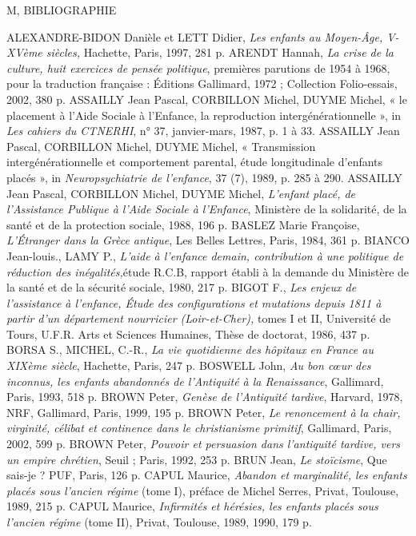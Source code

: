M, BIBLIOGRAPHIE
 
ALEXANDRE-BIDON Danièle et LETT Didier, \emph{Les enfants au Moyen-Âge, V-XVème siècles,} Hachette, Paris, 1997, 281 p.
ARENDT Hannah, \emph{La crise de la culture, huit exercices de pensée politique}, premières parutions de 1954 à 1968, pour la traduction française : Éditions Gallimard, 1972 ; Collection Folio-essais, 2002, 380 p.
ASSAILLY Jean Pascal, CORBILLON Michel, DUYME Michel, « le placement à l'Aide Sociale à l'Enfance, la reproduction intergénérationnelle », in \emph{Les cahiers du CTNERHI}, n° 37, janvier-mars, 1987, p. 1 à 33.
ASSAILLY Jean Pascal, CORBILLON Michel, DUYME Michel, « Transmission intergénérationnelle et comportement parental, étude longitudinale d'enfants placés », in \emph{Neuropsychiatrie de l'enfance}, 37 (7), 1989, p. 285 à 290.
ASSAILLY Jean Pascal, CORBILLON Michel, DUYME Michel, \emph{L'enfant placé, de l'Assistance Publique à l'Aide Sociale à l'Enfance}, Ministère de la solidarité, de la santé et de la protection sociale, 1988, 196 p.
BASLEZ Marie Françoise, \emph{L'Étranger dans la Grèce antique}, Les Belles Lettres, Paris, 1984, 361 p.
BIANCO Jean-louis., LAMY P., \emph{L'aide à l'enfance demain, contribution à une politique de réduction des inégalités,}étude R.C.B, rapport établi à la demande du Ministère de la santé et de la sécurité sociale, 1980, 217 p.
BIGOT F., \emph{Les enjeux de l'assistance à l'enfance, Étude des configurations et mutations depuis 1811 à partir d'un département nourricier (Loir-et-Cher),} tomes I et II, Université de Tours, U.F.R. Arts et Sciences Humaines, Thèse de doctorat, 1986, 437 p.
BORSA S., MICHEL, C.-R., \emph{La vie quotidienne des hôpitaux en France au XIXème siècle}, Hachette, Paris, 247 p.
BOSWELL John, \emph{Au bon cœur des inconnus, les enfants abandonnés de l'Antiquité à la Renaissance}, Gallimard, Paris, 1993, 518 p.
BROWN Peter, \emph{Genèse de l'Antiquité tardive}, Harvard, 1978, NRF, Gallimard, Paris, 1999, 195 p.
BROWN Peter, \emph{Le renoncement à la chair, virginité, célibat et continence dans le christianisme primitif}, Gallimard, Paris, 2002, 599 p.
BROWN Peter, \emph{Pouvoir et persuasion dans l'antiquité tardive, vers un empire chrétien}, Seuil ; Paris, 1992, 253 p.
BRUN Jean, \emph{Le stoïcisme}, Que sais-je ? PUF, Paris, 126 p.
CAPUL Maurice, \emph{Abandon et marginalité, les enfants placés sous l'ancien régime} (tome I), préface de Michel Serres, Privat, Toulouse, 1989, 215 p.
CAPUL Maurice, \emph{Infirmités et hérésies, les enfants placés sous l'ancien régime} (tome II), Privat, Toulouse, 1989, 1990, 179 p.
